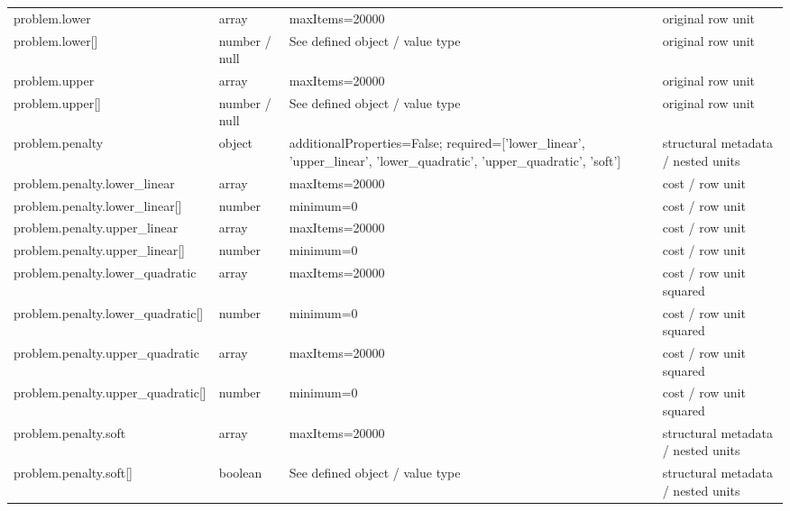 \begin{longtable}{@{}>{\raggedright\arraybackslash}p{}>{\raggedright\arraybackslash}p{}>{\raggedright\arraybackslash}p{}>{\raggedright\arraybackslash}p{}@{}}
problem.\allowbreak{}lower & array & maxItems=\allowbreak{}20000 & original row unit\\
problem.\allowbreak{}lower[] & number /\allowbreak{} null & See defined object /\allowbreak{} value type & original row unit\\
problem.\allowbreak{}upper & array & maxItems=\allowbreak{}20000 & original row unit\\
problem.\allowbreak{}upper[] & number /\allowbreak{} null & See defined object /\allowbreak{} value type & original row unit\\
problem.\allowbreak{}penalty & object & additionalProperties=\allowbreak{}False; required=\allowbreak{}['lower\_\allowbreak{}linear', 'upper\_\allowbreak{}linear', 'lower\_\allowbreak{}quadratic', 'upper\_\allowbreak{}quadratic', 'soft'] & structural metadata /\allowbreak{} nested units\\
problem.\allowbreak{}penalty.\allowbreak{}lower\_\allowbreak{}linear & array & maxItems=\allowbreak{}20000 & cost /\allowbreak{} row unit\\
problem.\allowbreak{}penalty.\allowbreak{}lower\_\allowbreak{}linear[] & number & minimum=\allowbreak{}0 & cost /\allowbreak{} row unit\\
problem.\allowbreak{}penalty.\allowbreak{}upper\_\allowbreak{}linear & array & maxItems=\allowbreak{}20000 & cost /\allowbreak{} row unit\\
problem.\allowbreak{}penalty.\allowbreak{}upper\_\allowbreak{}linear[] & number & minimum=\allowbreak{}0 & cost /\allowbreak{} row unit\\
problem.\allowbreak{}penalty.\allowbreak{}lower\_\allowbreak{}quadratic & array & maxItems=\allowbreak{}20000 & cost /\allowbreak{} row unit squared\\
problem.\allowbreak{}penalty.\allowbreak{}lower\_\allowbreak{}quadratic[] & number & minimum=\allowbreak{}0 & cost /\allowbreak{} row unit squared\\
problem.\allowbreak{}penalty.\allowbreak{}upper\_\allowbreak{}quadratic & array & maxItems=\allowbreak{}20000 & cost /\allowbreak{} row unit squared\\
problem.\allowbreak{}penalty.\allowbreak{}upper\_\allowbreak{}quadratic[] & number & minimum=\allowbreak{}0 & cost /\allowbreak{} row unit squared\\
problem.\allowbreak{}penalty.\allowbreak{}soft & array & maxItems=\allowbreak{}20000 & structural metadata /\allowbreak{} nested units\\
problem.\allowbreak{}penalty.\allowbreak{}soft[] & boolean & See defined object /\allowbreak{} value type & structural metadata /\allowbreak{} nested units\\
\end{longtable}\endgroup
